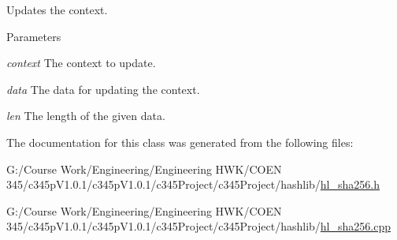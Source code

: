 Updates the context. 
\begin{DoxyParams}{Parameters}
\item[{\em context}]The context to update. \item[{\em data}]The data for updating the context. \item[{\em len}]The length of the given data. \end{DoxyParams}


The documentation for this class was generated from the following files:\begin{DoxyCompactItemize}
\item 
G:/Course Work/Engineering/Engineering HWK/COEN 345/c345pV1.0.1/c345pV1.0.1/c345Project/c345Project/hashlib/\hyperlink{hl__sha256_8h}{hl\_\-sha256.h}\item 
G:/Course Work/Engineering/Engineering HWK/COEN 345/c345pV1.0.1/c345pV1.0.1/c345Project/c345Project/hashlib/\hyperlink{hl__sha256_8cpp}{hl\_\-sha256.cpp}\end{DoxyCompactItemize}
